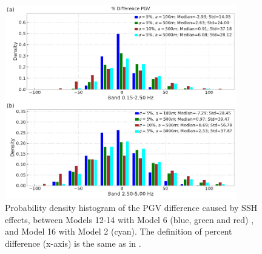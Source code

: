 \begin{figure}[!ht]
  \centering
  \includegraphics[width=0.9\textwidth,height=0.9\textheight,keepaspectratio]{figures/figure_highf_S5.pdf}
  \caption{Probability density histogram of the PGV difference caused by SSH effects, between Models 12-14 with Model 6 (blue, green and red) , and Model 16 with Model 2 (cyan). The definition of percent difference (x-axis) is the same as in .
  }
  \label{fig:highf-A5}
\end{figure}
\clearpage

